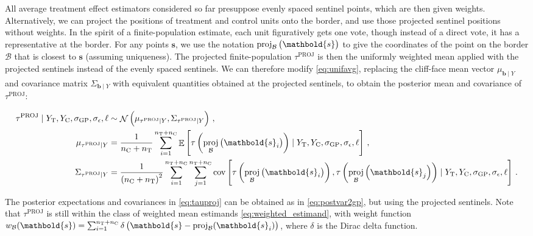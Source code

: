 \documentclass[letter]{article}
\DeclareMathOperator{\E}{\mathbb{E}}
\DeclareMathOperator{\cov}{{cov}}
\DeclareMathOperator{\normal}{\mathcal{N}}
\newcommand{\treat}{\mathrm{T}}
\newcommand{\ctrol}{\mathrm{C}}
\newcommand{\sigmaf}{\sigma_{\mathrm{GP}}}
\newcommand{\sigman}{\sigma_{\epsilon}}
\newcommand{\svec}{\mathbold{s}}
\newcommand{\border}{\mathcal{B}}
\newcommand{\sentinels}{\bm{b}}
\newcommand{\tauproj}{\tau^{\mathrm{PROJ}}}
\newcommand{\eqlabel}[1]{\label{#1}}
\DeclareMathOperator{\proj}{proj}
\newcommand{\weightb}{w_{\border}}
\begin{document}
All average treatment effect estimators considered so far presuppose evenly spaced sentinel points, which are then given weights.
Alternatively, we can project the positions of treatment and control units onto the border, and use those projected sentinel positions without weights.
In the spirit of a finite-population estimate, each unit figuratively gets one vote, though instead of a direct vote, it has a representative at the border.
For any points \(\svec\), we use the notation \(\proj_{\border}\del{\svec}\) to give the coordinates of the point on the border \(\border\) that is closest to \(\svec\) (assuming uniqueness).
The projected finite-population \(\tauproj\) is then the uniformly weighted mean applied with the projected sentinels instead of the evenly spaced sentinels.
We can therefore modify \eqref{eq:unifavg}, replacing the cliff-face mean vector \(\mu_{\sentinels \mid Y}\)
and covariance matrix \(\Sigma_{\sentinels \mid Y}\)
with equivalent quantities obtained at the projected sentinels,
to obtain the posterior mean and covariance of \(\tauproj\):

\begin{equation}\begin{split}
    \tauproj \mid Y_\treat{}, Y_\ctrol{}, \sigmaf, \sigman, \ell &\sim \normal\del{\mu_{\tauproj \mid Y}, \Sigma_{\tauproj \mid Y}}\,, \\
    \mu_{\tauproj \mid Y} &= \frac{1}{n_\ctrol{} + n_\treat{}} \sum_{i=1}^{n_\treat{}+n_\ctrol{}} 
        \E\sbr{
            \tau\del{
                \proj_{\border}\del{\svec_i}
            }
            \mid Y_\treat{}, Y_\ctrol{}, \sigmaf, \sigman, \ell
         } \,,\\
    \Sigma_{\tauproj \mid Y} &= \frac{1}{\del{n_\ctrol{} + n_\treat{}}^2}
        \sum_{i=1}^{n_\treat{}+n_\ctrol{}} 
        \sum_{j=1}^{n_\treat{}+n_\ctrol{}} 
        \cov\sbr{
            \tau\del{
                \proj_{\border}\del{\svec_i}
            },
            \tau\del{
                \proj_{\border}\del{\svec_j}
            }
            \mid Y_\treat{}, Y_\ctrol{}, \sigmaf, \sigman, \ell
        }\,.
\end{split}
\eqlabel{eq:tauproj}
\end{equation}

The posterior expectations and covariances in \eqref{eq:tauproj} can be obtained as in \eqref{eq:postvar2gp}, but using the projected sentinels.
Note that \(\tauproj\) is still within the class of weighted mean estimands \eqref{eq:weighted_estimand},
with weight function \(\weightb(\svec) = \sum_{i=1}^{n_\treat{}+n_\ctrol{}} \delta\del{ \svec - \proj_\border(\svec_i)}\), where \(\delta\) is the Dirac delta function.
\end{document}
